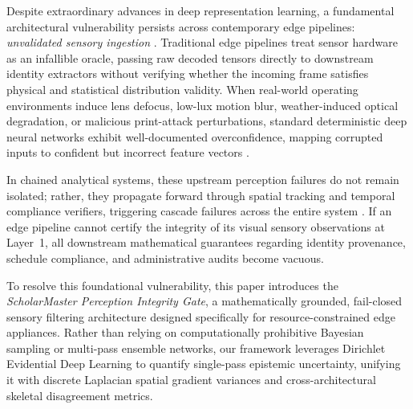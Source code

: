 \documentclass[10pt,journal,compsoc]{IEEEtran}
\begin{document}
Despite extraordinary advances in deep representation learning, a fundamental architectural vulnerability persists across contemporary edge pipelines: \textit{unvalidated sensory ingestion} \cite{sambasivan2021everyone, hendrycks2017baseline}. Traditional edge pipelines treat sensor hardware as an infallible oracle, passing raw decoded tensors directly to downstream identity extractors without verifying whether the incoming frame satisfies physical and statistical distribution validity. When real-world operating environments induce lens defocus, low-lux motion blur, weather-induced optical degradation, or malicious print-attack perturbations, standard deterministic deep neural networks exhibit well-documented overconfidence, mapping corrupted inputs to confident but incorrect feature vectors \cite{guo2017calibration, nguyen2015deep}.

In chained analytical systems, these upstream perception failures do not remain isolated; rather, they propagate forward through spatial tracking and temporal compliance verifiers, triggering cascade failures across the entire system \cite{sculley2015hidden}. If an edge pipeline cannot certify the integrity of its visual sensory observations at Layer~1, all downstream mathematical guarantees regarding identity provenance, schedule compliance, and administrative audits become vacuous.

To resolve this foundational vulnerability, this paper introduces the \textit{ScholarMaster Perception Integrity Gate}, a mathematically grounded, fail-closed sensory filtering architecture designed specifically for resource-constrained edge appliances. Rather than relying on computationally prohibitive Bayesian sampling or multi-pass ensemble networks, our framework leverages Dirichlet Evidential Deep Learning \cite{sensoy2018evidential} to quantify single-pass epistemic uncertainty, unifying it with discrete Laplacian spatial gradient variances and cross-architectural skeletal disagreement metrics. 
\end{document}

